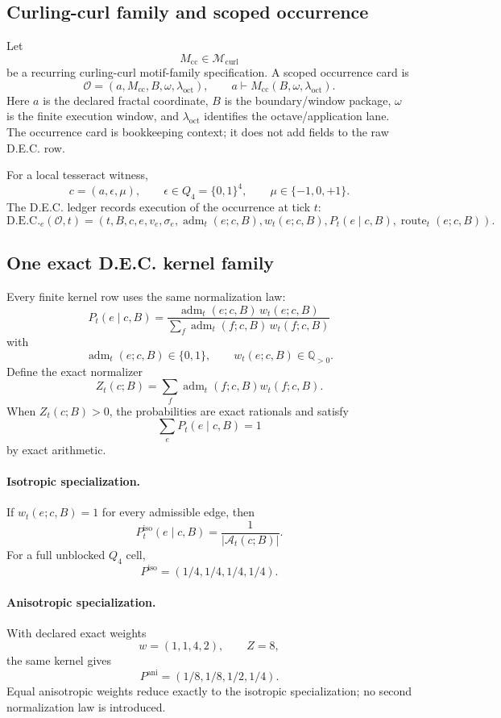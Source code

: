 \subsection{Curling-curl family and scoped occurrence}

Let
\[
M_{\mathrm{cc}}\in\mathcal M_{\mathrm{curl}}
\]
be a recurring curling-curl motif-family specification.  A scoped occurrence card is
\[
\mathcal O
=
(a,M_{\mathrm{cc}},B,\omega,\lambda_{\mathrm{oct}}),
\qquad
a\vdash M_{\mathrm{cc}}(B,\omega,\lambda_{\mathrm{oct}}).
\]
Here $a$ is the declared fractal coordinate, $B$ is the boundary/window package, $\omega$ is the finite execution window, and $\lambda_{\mathrm{oct}}$ identifies the octave/application lane.  The occurrence card is bookkeeping context; it does not add fields to the raw D.E.C. row.

For a local tesseract witness,
\[
c=(a,\epsilon,\mu),
\qquad
\epsilon\in Q_4=\{0,1\}^4,
\qquad
\mu\in\{-1,0,+1\}.
\]
The D.E.C. ledger records execution of the occurrence at tick $t$:
\[
\mathrm{D.E.C.}_e(\mathcal O,t)
=
(t,B,c,e,v_e,\sigma_e,\operatorname{adm}_t(e;c,B),w_t(e;c,B),P_t(e\mid c,B),\operatorname{route}_t(e;c,B)).
\]

\subsection{One exact D.E.C. kernel family}

Every finite kernel row uses the same normalization law:
\[
\boxed{
P_t(e\mid c,B)
=
\frac{\operatorname{adm}_t(e;c,B)\,w_t(e;c,B)}
{\displaystyle\sum_f\operatorname{adm}_t(f;c,B)\,w_t(f;c,B)}
}
\]
with
\[
\operatorname{adm}_t(e;c,B)\in\{0,1\},
\qquad
w_t(e;c,B)\in\mathbb Q_{>0}.
\]
Define the exact normalizer
\[
Z_t(c;B)=\sum_f\operatorname{adm}_t(f;c,B)w_t(f;c,B).
\]
When $Z_t(c;B)>0$, the probabilities are exact rationals and satisfy
\[
\sum_e P_t(e\mid c,B)=1
\]
by exact arithmetic.

\paragraph{Isotropic specialization.}
If $w_t(e;c,B)=1$ for every admissible edge, then
\[
P_t^{\mathrm{iso}}(e\mid c,B)=\frac{1}{|\mathcal A_t(c;B)|}.
\]
For a full unblocked $Q_4$ cell,
\[
P^{\mathrm{iso}}=(1/4,1/4,1/4,1/4).
\]

\paragraph{Anisotropic specialization.}
With declared exact weights
\[
w=(1,1,4,2),
\qquad
Z=8,
\]
the same kernel gives
\[
P^{\mathrm{ani}}=(1/8,1/8,1/2,1/4).
\]
Equal anisotropic weights reduce exactly to the isotropic specialization; no second normalization law is introduced.

